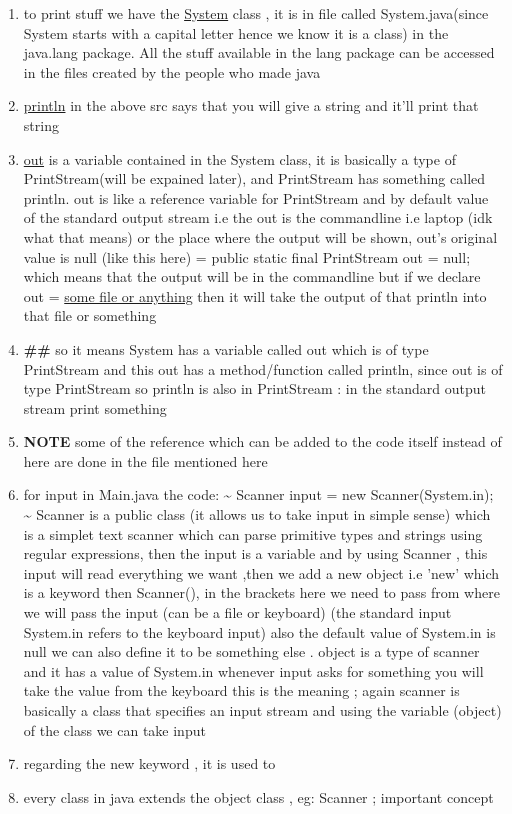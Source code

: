 \documentclass[11pt]{article}
\begin{document}
\begin{enumerate}
\item to print stuff we have the \uline{System} class , it is in file called System.java(since System starts with a capital letter hence we know it is a class) in the java.lang package. All the stuff available in the lang package can be accessed in the files created by the people who made java
\item \uline{println} in the above src says that you will give a string and it'll print that string
\item \uline{out} is a variable contained in the System class, it is basically a type of PrintStream(will be expained later), and PrintStream has something called println. out is like a reference variable for PrintStream and by default value of the standard output stream i.e the out is the commandline i.e laptop (idk what that means) or the place where the output will be shown, out's original value is null (like this here) = public static final PrintStream out = null; which means that the output will be in the commandline but if we declare out = \uline{some file or anything} then it will take the output of that println into that file or something
\item \textbf{\#\#} so it means System has a variable called out which is of type PrintStream and this out has a method/function called println, since out is of type PrintStream so println is also in PrintStream : in the standard output stream print something

\item \textbf{NOTE} some of the reference  which can be added to the code itself instead of here are done in the file mentioned here

\item for input in Main.java the code: \textasciitilde{} Scanner input = new Scanner(System.in); \textasciitilde{}  Scanner is a public class (it allows us to take input in simple sense) which is a simplet text scanner which can parse primitive types and strings using regular expressions, then the input is a variable and by using Scanner , this input will read everything we want ,then we add a new object i.e 'new' which is a keyword then Scanner(), in the brackets here we need to pass from where we will pass the input (can be a file or keyboard) (the standard input System.in refers to the keyboard input) also the default value of System.in is null we can also define it to be something else . object is a type of scanner and it has a value of System.in whenever input asks for something you will take the value from the keyboard this is the meaning ; again scanner is basically a class that specifies an input stream and using the variable (object) of the class we can take input
\item regarding the new keyword , it is used to

\item every class in java extends the object class , eg: Scanner ; important concept
\end{enumerate}
\end{document}
